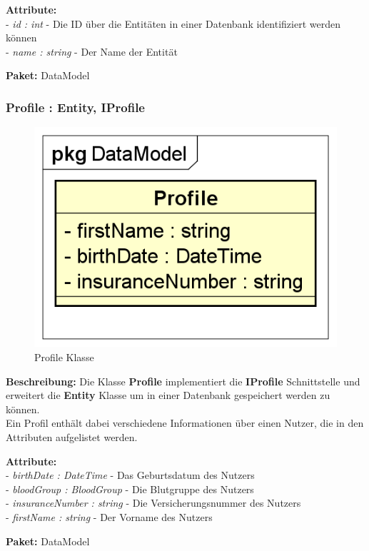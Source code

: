 \documentclass[a4paper]{scrreprt}
\begin{document}
\textbf{Attribute:}\\
- \textit{id : int} - Die ID über die Entitäten in einer Datenbank identifiziert werden können\\
- \textit{name : string} - Der Name der Entität

\textbf{Paket:} DataModel

\subsubsection{Profile : Entity, IProfile}
\begin{figure}[H]
\centering
\includegraphics[width=0.45\textheight]{graphics/Klassendiagramme/Model/Profile.png}
\caption{Profile Klasse}
\end{figure}
\textbf{Beschreibung:} Die Klasse \textbf{Profile} implementiert die \textbf{IProfile} Schnittstelle und erweitert die \textbf{Entity} Klasse um in einer Datenbank gespeichert werden zu können.\\
Ein Profil enthält dabei verschiedene Informationen über einen Nutzer, die in den Attributen aufgelistet werden.

\textbf{Attribute:}\\
- \textit{birthDate : DateTime} - Das Geburtsdatum des Nutzers\\
- \textit{bloodGroup : BloodGroup} - Die Blutgruppe des Nutzers\\
- \textit{insuranceNumber : string} - Die Versicherungsnummer des Nutzers\\
- \textit{firstName : string} - Der Vorname des Nutzers

\textbf{Paket:} DataModel
\end{document}
